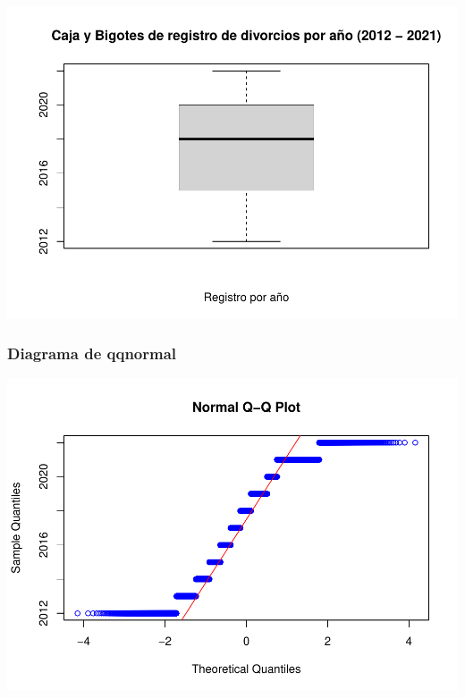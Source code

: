 \documentclass[
]{article}
\newenvironment{Shaded}{\begin{snugshade}}{\end{snugshade}}
\newcommand{\AttributeTok}[1]{\textcolor[rgb]{0.77,0.63,0.00}{#1}}
\newcommand{\FunctionTok}[1]{\textcolor[rgb]{0.00,0.00,0.00}{#1}}
\newcommand{\NormalTok}[1]{#1}
\newcommand{\SpecialCharTok}[1]{\textcolor[rgb]{0.00,0.00,0.00}{#1}}
\newcommand{\StringTok}[1]{\textcolor[rgb]{0.31,0.60,0.02}{#1}}
\begin{document}
\begin{Shaded}
\end{Shaded}

\includegraphics{Proyecto_files/figure-latex/unnamed-chunk-37-1.pdf}

\hypertarget{diagrama-de-qqnormal}{%
\subsubsection{Diagrama de qqnormal}\label{diagrama-de-qqnormal}}

\includegraphics{Proyecto_files/figure-latex/normalQQ-1.pdf}
\end{document}
